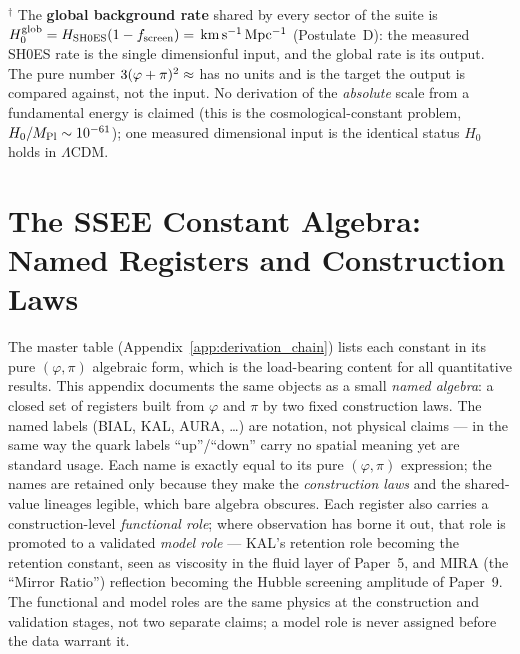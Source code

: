 \documentclass[12pt,a4paper]{article}
\newcommand{\kmsu}{\mathrm{km\,s^{-1}\,Mpc^{-1}}}
\begin{document}
\footnotesize $^\dagger$ The \textbf{global background rate} shared by every
sector of the suite is $H_0^{\rm glob}=H_{\rm SH0ES}(1-f_{\rm screen})=\val{H0_GLOBAL_d3}\,\kmsu$
(Postulate~D): the measured SH0ES rate is the single dimensionful input, and the
global rate is its output. The pure number $3(\varphi+\pi)^2\approx\val{H0_ALG_d3}$
has no units and is the target the output is compared against, not the input.
No derivation of the \emph{absolute} scale from a fundamental energy is claimed
(this is the cosmological-constant problem, $H_0/M_{\rm Pl}\sim10^{-61}$); one
measured dimensional input is the identical status $H_0$ holds in $\Lambda$CDM.

\section{The SSEE Constant Algebra: Named Registers and Construction Laws}
\label{app:lineage}

The master table (Appendix~\ref{app:derivation_chain}) lists each constant
in its pure $(\varphi,\pi)$ algebraic form, which is the load-bearing content
for all quantitative results. This appendix documents the same objects as a
small \emph{named algebra}: a closed set of registers built from $\varphi$ and
$\pi$ by two fixed construction laws. The named labels (BIAL, KAL, AURA,
\ldots) are notation, not physical claims --- in the same way the quark labels
``up''/``down'' carry no spatial meaning yet are standard usage. Each name is
exactly equal to its pure $(\varphi,\pi)$ expression; the names are retained
only because they make the \emph{construction laws} and the shared-value
lineages legible, which bare algebra obscures. Each register also carries a
construction-level \emph{functional role}; where observation has borne it out,
that role is promoted to a validated \emph{model role} --- KAL's retention role
becoming the retention constant, seen as viscosity in the fluid layer of Paper~5, and MIRA (the ``Mirror Ratio'')
reflection becoming the Hubble screening amplitude of Paper~9. The functional
and model roles are the same physics at the construction and validation stages,
not two separate claims; a model role is never assigned before the data warrant
it.
\end{document}
